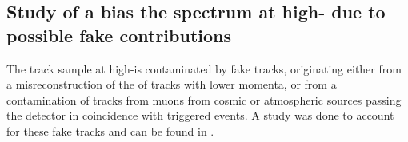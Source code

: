 \subsection{Study of a bias the spectrum at high-\texorpdfstring{\pT}{pT} due to possible fake contributions}
\label{sec:biasStudy}

The track sample at high-\pT is contaminated by fake tracks, originating either from a misreconstruction of the \pT of tracks with lower momenta, or from a contamination of tracks from muons from cosmic or atmospheric sources passing the detector in coincidence with triggered events. A study was done to account for these fake tracks and can be found in \cite{anaNoteMFasel}.